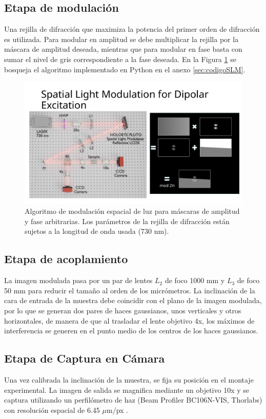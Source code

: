 \subsection{Etapa de modulación}
Una rejilla de difracción que maximiza la potencia del primer orden de difracción es utilizada. Para modular en amplitud se debe multiplicar la rejilla por la máscara de amplitud deseada, mientras que para modular en fase basta con sumar el nivel de gris correspondiente a la fase deseada. En la Figura \ref{fig:SLMblaze} se bosqueja el algoritmo implementado en Python en el anexo \ref{sec:codigoSLM}.

{
\begin{figure}
    \centering
    \includegraphics[width=0.35\linewidth, trim={19.5cm 0 0 5cm}, clip]{media/SLMblaze4.png}
    \caption[Modulación espacial de luz para máscaras de amplitud y fase arbitrarias.]{Algoritmo de modulación espacial de luz para máscaras de amplitud y fase arbitrarias. Los parámetros de la rejilla de difracción están sujetos a la longitud de onda usada (730 nm).\label{fig:SLMblaze}}
\end{figure}
}

\subsection{Etapa de acoplamiento}
La imagen modulada pasa por un par de lentes $L_2$ de foco 1000 mm y $L_3$ de foco 50 mm para reducir el tamaño al orden de los micrómetros. La inclinación de la cara de entrada de la muestra debe coincidir con el plano de la imagen modulada, por lo que se generan dos pares de haces gaussianos, unos verticales y otros horizontales, de manera de que al trasladar el lente objetivo 4x, los máximos de interferencia se generen en el punto medio de los centros de los haces gaussianos.

\subsection{Etapa de Captura en Cámara}
Una vez calibrada la inclinación de la muestra, se fija su posición en el montaje experimental. La imagen de salida se magnifica mediante un objetivo 10x y se captura utilizando un perfilómetro de haz (Beam Profiler BC106N-VIS, Thorlabs) con resolución espacial de 6.45 $\mu$m/px \citep{thorlabs_beam_profiler}.

